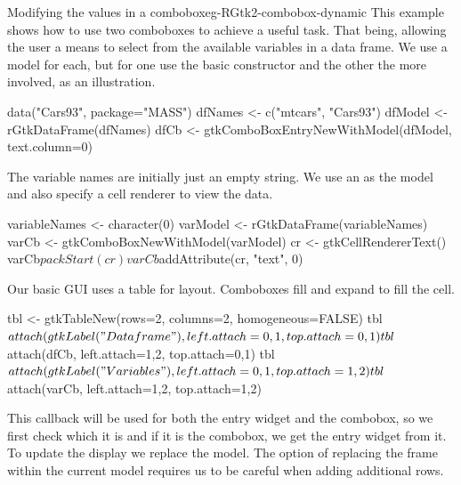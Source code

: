 \begin{example}{Modifying the values in a combobox}{eg-RGtk2-combobox-dynamic}
This example shows how to use two comboboxes to achieve a useful
task. That being, allowing the user a means to select from the
available variables in a data frame. We use a 
model for each, but for one use the basic constructor and the other
the more involved, as an illustration.
\begin{Schunk}
\begin{Sinput}
 data("Cars93", package="MASS")
 dfNames <- c("mtcars", "Cars93")
 dfModel <- rGtkDataFrame(dfNames)
 dfCb <- gtkComboBoxEntryNewWithModel(dfModel, text.column=0)
\end{Sinput}
\end{Schunk}

The variable names are initially just an empty string. We use an
  as the
model and also specify a cell renderer to view the data.

\begin{Schunk}
\begin{Sinput}
 variableNames <- character(0)
 varModel <- rGtkDataFrame(variableNames)
 varCb <- gtkComboBoxNewWithModel(varModel)
 cr <- gtkCellRendererText()
 varCb$packStart(cr)
 varCb$addAttribute(cr, "text", 0)
\end{Sinput}
\end{Schunk}

Our basic GUI uses a table for layout. Comboboxes fill and expand to fill the cell.
\begin{Schunk}
\begin{Sinput}
 tbl <- gtkTableNew(rows=2, columns=2, homogeneous=FALSE)
 tbl$attach(gtkLabel("Data frame"), left.attach=0,1, top.attach=0,1)
 tbl$attach(dfCb, left.attach=1,2, top.attach=0,1)
 tbl$attach(gtkLabel("Variables"), left.attach=0,1, top.attach=1,2)
 tbl$attach(varCb, left.attach=1,2, top.attach=1,2)
\end{Sinput}
\end{Schunk}
This callback will be used for both the entry widget and the combobox,
so we first check which it is and if it is the combobox, we get the
entry widget from it. To update the display we replace the model. The
option of replacing the frame within the current model requires us to
be careful when adding additional rows.


\end{example}
